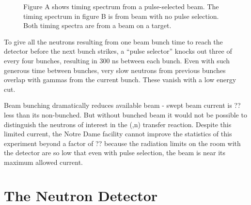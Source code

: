 \begin{figure}[htp]
\centering
{}
\label{fig:PSvsNPS_TOF}
\caption{Figure A shows timing spectrum from a pulse-selected beam.  The timing spectrum in figure B is from beam with no pulse selection.  Both timing spectra are from a  beam on a  target.}
\end{figure}

To give all the neutrons resulting from one beam bunch time to reach the detector before the next bunch strikes, a ``pulse selector'' knocks out three of every four bunches, resulting in 300 ns between each bunch.  Even with such generous time between bunches, very slow neutrons from previous bunches overlap with gammas from the current bunch.  These vanish with a low energy cut.


Beam bunching dramatically reduces available beam - swept beam current is ?? less than its non-bunched.  But without bunched beam it would not be possible to distinguish the neutrons of interest in the (,n) transfer reaction.  Despite this limited current, the Notre Dame facility cannot improve the statistics of this experiment beyond a factor of ?? because the radiation limits on the room with the detector are so low that even with pulse selection, the beam is near its maximum allowed current.


\section{The Neutron Detector}

